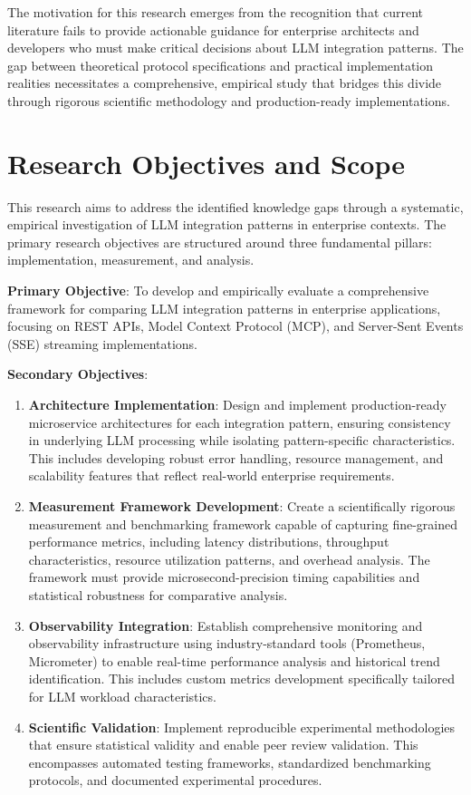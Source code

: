 The motivation for this research emerges from the recognition that current literature fails to provide actionable guidance for enterprise architects and developers who must make critical decisions about LLM integration patterns. The gap between theoretical protocol specifications and practical implementation realities necessitates a comprehensive, empirical study that bridges this divide through rigorous scientific methodology and production-ready implementations.

\section{Research Objectives and Scope}

This research aims to address the identified knowledge gaps through a systematic, empirical investigation of LLM integration patterns in enterprise contexts. The primary research objectives are structured around three fundamental pillars: implementation, measurement, and analysis.

\textbf{Primary Objective}: To develop and empirically evaluate a comprehensive framework for comparing LLM integration patterns in enterprise applications, focusing on REST APIs, Model Context Protocol (MCP), and Server-Sent Events (SSE) streaming implementations.

\textbf{Secondary Objectives}:

\begin{enumerate}
    \item \textbf{Architecture Implementation}: Design and implement production-ready microservice architectures for each integration pattern, ensuring consistency in underlying LLM processing while isolating pattern-specific characteristics. This includes developing robust error handling, resource management, and scalability features that reflect real-world enterprise requirements.
    
    \item \textbf{Measurement Framework Development}: Create a scientifically rigorous measurement and benchmarking framework capable of capturing fine-grained performance metrics, including latency distributions, throughput characteristics, resource utilization patterns, and overhead analysis. The framework must provide microsecond-precision timing capabilities and statistical robustness for comparative analysis.
    
    \item \textbf{Observability Integration}: Establish comprehensive monitoring and observability infrastructure using industry-standard tools (Prometheus, Micrometer) to enable real-time performance analysis and historical trend identification. This includes custom metrics development specifically tailored for LLM workload characteristics.
    
    \item \textbf{Scientific Validation}: Implement reproducible experimental methodologies that ensure statistical validity and enable peer review validation. This encompasses automated testing frameworks, standardized benchmarking protocols, and documented experimental procedures.
\end{enumerate}


